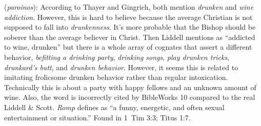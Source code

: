 \item[Wine romp,]

(\textit{paroinos}):
According to Thayer and Gingrich, both mention \emph{drunken} and \emph{wine addiction}. However, this is hard to believe because the average Christian is not supposed to fall into \emph{drunkenness}. It's more probable that the Bishop should be soberer than the average believer in Christ. Then Liddell mentions  as ``addicted to wine, drunken'' but there is a whole array of cognates that assert a different behavior,  \emph{befitting a drinking party}, \emph{drinking songs},  \emph{play drunken tricks},  \emph{drunkard's butt}, and  \emph{drunken behavior}. However, it seems this is related to imitating frolicsome drunken behavior rather than regular intoxication. Technically this is about a party with happy fellows and an unknown amount of wine. Also, the word  is incorrectly cited by BibleWorks 10 compared to the real Liddell \& Scott. \emph{Romp} defines as ``a funny, energetic, and often sexual entertainment or situation.''
Found in 1~Tim 3:3; Titus 1:7.

